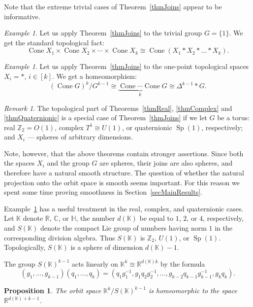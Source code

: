\documentclass[english, 12pt]{amsproc}
\newcounter{stmcounter}[section]
\numberwithin{equation}{section}
\theoremstyle{plain}
\newtheorem{prop}[stmcounter]{Proposition}
\theoremstyle{definition}
\theoremstyle{remark}
\newtheorem{ex}[stmcounter]{Example}
\newtheorem{rem}[stmcounter]{Remark}
\DeclareMathOperator{\Sp}{Sp}
\DeclareMathOperator{\Cone}{Cone}
\newcommand{\Zo}{\mathbb{Z}}
\newcommand{\Ro}{\mathbb{R}}
\newcommand{\Co}{\mathbb{C}}
\newcommand{\Ho}{\mathbb{H}}
\newcommand{\Zt}{\Zo_2}
\newcommand{\Ko}{\mathbb{K}}
\begin{document}
Note that the extreme trivial cases of Theorem~\ref{thmJoins} appear to be informative.

\begin{ex}\label{exTrivialGroup}
Let us apply Theorem~\ref{thmJoins} to the trivial group $G=\{1\}$. We get the standard topological fact:
\[
\Cone X_1\times \Cone X_2\times \cdots \times \Cone X_k\cong \Cone(X_1\ast X_2\ast \ldots\ast X_k).
\]
\end{ex}

\begin{ex}\label{exTrivialSpace}
Let us apply Theorem~\ref{thmJoins} to the one-point topological spaces $X_i=\ast$, $i\in[k]$. We get a homeomorphism:
\[
(\Cone G)^{k}/G^{k-1}\cong\underbrace{\Cone\cdots\Cone}_k G\cong \Delta^{k-1}\ast G.
\]
\end{ex}

\begin{rem}\label{remParticCases}
The topological part of Theorems~\ref{thmReal}, \ref{thmComplex} and \ref{thmQuaternionic} is a special case of Theorem~\ref{thmJoins} if we let $G$ be a torus: real $\Zt=O(1)$, complex $T^1\cong U(1)$, or quaternionic $\Sp(1)$, respectively; and $X_i$ --- spheres of arbitrary dimensions.

Note, however, that the above theorems contain stronger assertions. Since both the spaces $X_i$ and the group $G$ are spheres, their joins are also spheres, and therefore have a natural smooth structure. The question of whether the natural projection onto the orbit space is smooth seems important. For this reason we spent some time proving smoothness in Section~\ref{secMainResults}.
\end{rem}

Example~\ref{exTrivialSpace} has a useful treatment in the real, complex, and quaternionic cases. Let $\Ko$ denote $\Ro$, $\Co$, or $\Ho$, the number $d(\Ko)$ be equal to $1$, $2$, or $4$, respectively, and $S(\Ko)$ denote the compact Lie group of numbers having norm $1$ in the corresponding division algebra. Thus $S(\Ko)$ is $\Zt$, $U(1)$, or $\Sp(1)$. Topologically, $S(\Ko)$ is a sphere of dimension $d(\Ko)-1$.

The group $S(\Ko)^{k-1}$ acts linearly on $\Ko^k\cong \Ro^{d(\Ko)k}$ by the formula
\begin{equation}\label{eqCodiagOnEuclid}
(g_1,\ldots,g_{k-1})(q_1,\ldots,q_k)=(q_1g_1^{-1},g_1q_2g_2^{-1},\ldots,g_{k-2}q_{k-1}g_{k-1}^{-1},g_{k}q_{k}).
\end{equation}

\begin{prop}\label{propLocal}
The orbit space $\Ko^k/S(\Ko)^{k-1}$ is homeomorphic to the space $\Ro^{d(\Ko)+k-1}$.
\end{prop}
\end{document}
